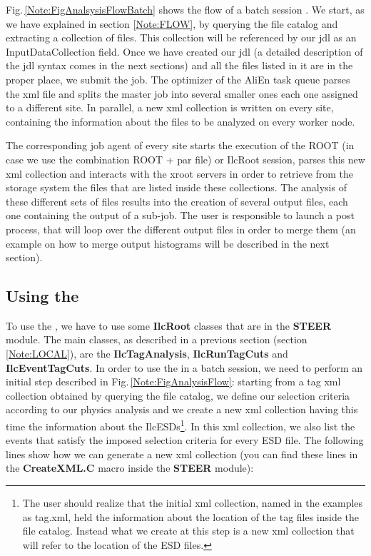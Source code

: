 Fig.\,\ref{Note:FigAnalsysisFlowBatch} shows the flow of a batch session \cite{Note:RefIlcenTutorial}. We start, as we have explained in section \ref{Note:FLOW}, by querying the file catalog and extracting a collection of files. This collection will be referenced by our jdl as an {\ttfamily InputDataCollection} field. Once we have created our jdl (a detailed description of the jdl syntax comes in the next sections) and all the files listed in it are in the proper place, we submit the job. The optimizer of the AliEn task queue parses the xml file and splits the master job into several smaller ones each one assigned to a different site. In parallel, a new xml collection is written on every site, containing the information about the files to be analyzed on every worker node.

The corresponding job agent of every site starts the execution of the ROOT (in case we use the combination ROOT + {\ttfamily par file}) or IlcRoot session, parses this new xml collection and interacts with the xroot servers in order to retrieve from the storage system the files that are listed inside these collections. The analysis of these different sets of files results into the creation of several output files, each one containing the output of a sub-job. The user is responsible to launch a post process, that will loop over the different output files in order to merge them (an example on how to merge output histograms will be described in the next section).


\subsection{Using the \tag}

To use the \tag, we have to use some {\ttfamily \textbf{IlcRoot}} classes that are in the {\ttfamily \textbf{STEER}} module. The main classes, as described in a previous section (section \ref{Note:LOCAL}), are the {\ttfamily \textbf{IlcTagAnalysis}}, {\ttfamily \textbf{IlcRunTagCuts}} and {\ttfamily \textbf{IlcEventTagCuts}}. In order to use the \tag in a batch session, we need to perform an initial step described in Fig.\,\ref{Note:FigAnalysisFlow}: starting from a tag xml collection obtained by querying the file catalog, we define our selection criteria according to our physics analysis and we create a new xml collection having this time the information about the IlcESDs\footnote{The user should realize that the initial xml collection, named in the examples as {\ttfamily tag.xml}, held the information about the location of the tag files inside the file catalog. Instead what we create at this step is a new xml collection that will refer to the location of the ESD files.}. In this xml collection, we also list the events that satisfy the imposed selection criteria for every ESD file. The following lines show how we can generate a new xml collection (you can find these lines in the {\ttfamily \textbf{CreateXML.C}} macro inside the {\ttfamily \textbf{STEER}} module):

